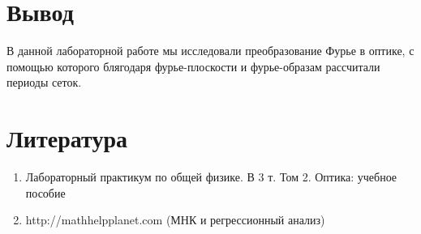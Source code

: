 \documentclass[a4paper, 12pt]{article}%
\begin{document}
\section{Вывод}
В данной лабораторной работе мы исследовали преобразование Фурье в оптике, с помощью которого блягодаря фурье-плоскости и фурье-образам рассчитали периоды сеток.
 

\section{Литература}

\begin{enumerate}

\item Лабораторный практикум по общей физике. В 3 т. Том 2. Оптика: учебное пособие

\item http://mathhelpplanet.com (МНК и регрессионный анализ)


\end{enumerate}	
\end{document}

